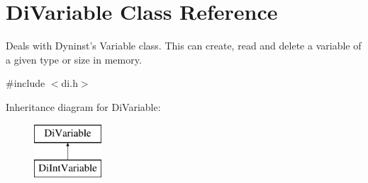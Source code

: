 \hypertarget{class_di_variable}{\section{Di\-Variable Class Reference}
\label{class_di_variable}
}


Deals with Dyninst's Variable class. This can create, read and delete a variable of a given type or size in memory.  




{\ttfamily \#include $<$di.\-h$>$}

Inheritance diagram for Di\-Variable\-:\begin{figure}[H]
\begin{center}
\leavevmode
\includegraphics[height=2.000000cm]{class_di_variable}
\end{center}
\end{figure}
